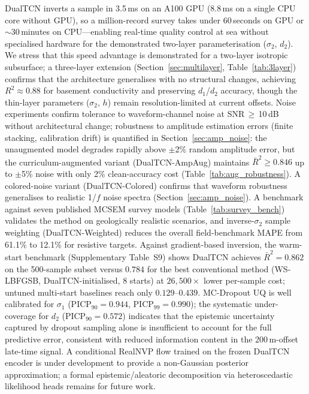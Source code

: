 \documentclass[journal]{IEEEtran}
\begin{document}
DualTCN inverts a sample in 3.5\,ms on an A100 GPU (8.8\,ms on a
single CPU core without GPU), so a million-record survey takes under
60\,seconds on GPU or $\sim$30\,minutes on CPU---enabling real-time
quality control at sea without specialised hardware for the
demonstrated
two-layer parameterisation ($\sigma_2$, $d_2$).  We stress that
this speed advantage is demonstrated for a two-layer isotropic
subsurface; a three-layer extension
(Section~\ref{sec:multilayer}, Table~\ref{tab:3layer})
confirms that the architecture generalises with no structural changes,
achieving $R^2 \approx 0.88$ for basement conductivity and preserving
$d_1$/$d_2$ accuracy, though the thin-layer parameters ($\sigma_2$, $h$)
remain resolution-limited at current offsets.  Noise experiments confirm tolerance to
waveform-channel noise at SNR\,$\geq$\,10\,dB without architectural
change; robustness to amplitude estimation errors (finite stacking,
calibration drift) is quantified in Section~\ref{sec:amp_noise}:
the unaugmented model degrades rapidly above $\pm$2\% random
amplitude error, but the curriculum-augmented variant
(DualTCN-AmpAug) maintains $\bar{R}^2 \geq 0.846$ up to $\pm$5\%
noise with only 2\% clean-accuracy cost
(Table~\ref{tab:aug_robustness}).  A colored-noise variant
(DualTCN-Colored) confirms that waveform robustness generalises to
realistic 1/$f$ noise spectra (Section~\ref{sec:amp_noise}).
A benchmark against seven published MCSEM survey models
(Table~\ref{tab:survey_bench}) validates the method on geologically
realistic scenarios, and inverse-$\sigma_2$ sample weighting
(DualTCN-Weighted) reduces the overall field-benchmark MAPE from
61.1\% to 12.1\% for resistive targets.  Against gradient-based inversion, the warm-start
benchmark (Supplementary Table~S9) shows DualTCN achieves $\bar{R}^2
= 0.862$ on the 500-sample subset versus $0.784$ for the best
conventional method (WS-LBFGSB, DualTCN-initialised, 8 starts)
at $26{,}500\times$ lower per-sample cost; untuned multi-start
baselines reach only $0.129$--$0.439$. MC-Dropout UQ is well
calibrated for $\sigma_1$ (PICP$_{90} = 0.944$,
PICP$_{99} = 0.990$); the systematic under-coverage for $d_2$
(PICP$_{90} = 0.572$) indicates that the epistemic uncertainty
captured by dropout sampling alone is insufficient to account for
the full predictive error, consistent with reduced information
content in the 200\,m-offset late-time signal. A conditional RealNVP
flow trained on the frozen DualTCN encoder is under development to
provide a non-Gaussian posterior approximation; a formal
epistemic/aleatoric decomposition via heteroscedastic likelihood
heads remains for future work.
\end{document}
